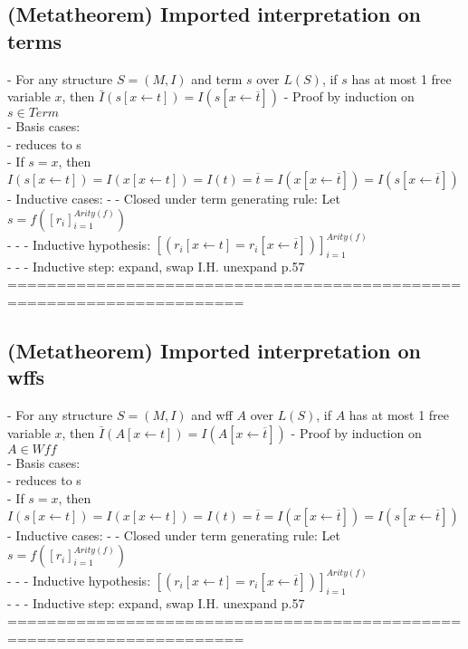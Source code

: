 \documentclass{article}
\begin{document}
\subsection{(Metatheorem) Imported interpretation on terms}
	- For any structure $S = (M, I)$ and term $s$ over $L(S)$, if $s$ has at most 1 free variable $x$, then $\bar I(s[x \leftarrow t]) = I(s[x \leftarrow \overline t])$
	- Proof by induction on $s \in Term$ \\
	- Basis cases: \\
		- reduces to s \\
		- If $s = x$, then $I(s[x \leftarrow t]) = I(x[x \leftarrow t]) = I(t) = \overline t = I(x[x \leftarrow \overline t]) =I(s[x \leftarrow \overline t])$ \\
	- Inductive cases:
		- - Closed under term generating rule: Let $s = f([r_i]_{i=1}^{Arity(f)})$ \\
			- - - Inductive hypothesis: $[(r_i[x \leftarrow t] = r_i[x \leftarrow \overline t])]_{i=1}^{Arity(f)}$ \\
			- - - Inductive step: expand, swap I.H. unexpand p.57 \\
	======================================================================
\subsection{(Metatheorem) Imported interpretation on wffs}
	- For any structure $S = (M, I)$ and wff $A$ over $L(S)$, if $A$ has at most 1 free variable $x$, then $\bar I(A[x \leftarrow t]) = I(A[x \leftarrow \overline t])$
	- Proof by induction on $A \in Wff$ \\ %
	- Basis cases: \\
		- reduces to s \\
		- If $s = x$, then $I(s[x \leftarrow t]) = I(x[x \leftarrow t]) = I(t) = \overline t = I(x[x \leftarrow \overline t]) =I(s[x \leftarrow \overline t])$ \\
	- Inductive cases:
		- - Closed under term generating rule: Let $s = f([r_i]_{i=1}^{Arity(f)})$ \\
			- - - Inductive hypothesis: $[(r_i[x \leftarrow t] = r_i[x \leftarrow \overline t])]_{i=1}^{Arity(f)}$ \\
			- - - Inductive step: expand, swap I.H. unexpand p.57 \\
	======================================================================
\end{document}
